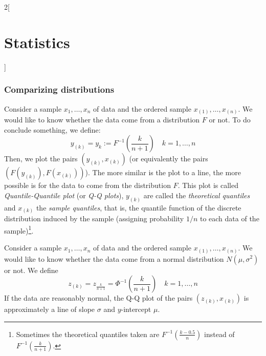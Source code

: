 \documentclass[../../../main.tex]{subfiles}
\begin{document}
\begin{multicols}{2}[\section{Statistics}]
  \subsubsection{Comparizing distributions}
  \begin{definition}[Q-Q plots]
    Consider a sample $x_1,\ldots,x_n$ of data and the ordered sample $x_{(1)},\ldots,x_{(n)}$. We would like to know whether the data come from a distribution $F$ or not. To do conclude something, we define: $$y_{(k)}=y_k:=F^{-1}\left(\frac{k}{n+1}\right)\quad k=1,\ldots,n$$
    Then, we plot the pairs $(y_{(k)},x_{(k)})$ (or equivalently the pairs $(F(y_{(k)}),F(x_{(k)}))$). The more similar is the plot to a line, the more possible is for the data to come from the distribution $F$. This plot is called \emph{Quantile-Quantile plot} (or \emph{Q-Q plots}), $y_{(k)}$ are called the \emph{theoretical quantiles} and $x_{(k)}$ the \emph{sample quantiles}, that is, the quantile function of the discrete distribution induced by the sample (assigning probability $1/n$ to each data of the sample)\footnote{Sometimes the theoretical quantiles taken are $F^{-1}\left(\frac{k-0.5}{n}\right)$ instead of $F^{-1}\left(\frac{k}{n+1}\right)$.}.
  \end{definition}
  \begin{proposition}
    Consider a sample $x_1,\ldots,x_n$ of data and the ordered sample $x_{(1)},\ldots,x_{(n)}$. We would like to know whether the data come from a normal distribution $N(\mu,\sigma^2)$ or not. We define $$z_{(k)}=z_{\frac{k}{n+1}}=\Phi^{-1}\left(\frac{k}{n+1}\right)\quad k=1,\ldots,n$$
    If the data are reasonably normal, the Q-Q plot of the pairs $(z_{(k)},x_{(k)})$ is approximately a line of slope $\sigma$ and $y$-intercept $\mu$.
  \end{proposition}
  \begin{center}
    \begin{minipage}{\linewidth}
      \centering
      
    \end{minipage}
  \end{center}
\end{multicols}
\end{document}

